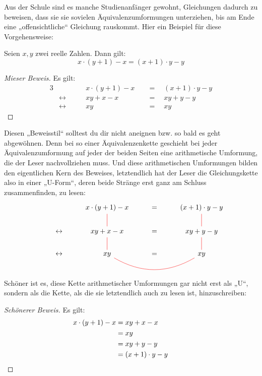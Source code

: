 \begin{bem}[„Gleichungs-U's“]
    Aus der Schule sind es manche Studienanfänger gewohnt, Gleichungen dadurch zu beweisen, dass sie sie sovielen Äquivalenzumformungen unterziehen, bis am Ende eine „offensichtliche“ Gleichung rauskommt. Hier ein Beispiel für diese Vorgehensweise:
    \begin{bsp}
    Seien $x,y$ zwei reelle Zahlen. Dann gilt:
        \[ x\cdot (y+1)-x = (x+1)\cdot y-y\]
    \end{bsp}
    \begin{proof}[Mieser Beweis]\let\qed\relax
        Es gilt:
        \begin{alignat*}{3}
            && x\cdot (y+1)-x& \quad=\quad (x+1)\cdot y-y \\
            &\leftrightarrow\qquad& xy + x  -x& \quad=\quad xy + y - y \\
            &\leftrightarrow\qquad& xy & \quad=\quad xy
        \end{alignat*}
    \end{proof}
    Diesen „Beweisstil“ solltest du dir nicht aneignen bzw. so bald es geht abgewöhnen. Denn bei so einer Äquivalenzenkette geschieht bei jeder Äquivalenzumformung auf jeder der beiden Seiten eine arithmetische Umformung, die der Leser nachvollziehen muss. Und diese arithmetischen Umformungen bilden den eigentlichen Kern des Beweises, letztendlich hat der Leser die Gleichungskette also in einer „U-Form“, deren beide Stränge erst ganz am Schluss zusammenfinden, zu lesen:
    \[\begin{tikzcd}
        && x\cdot (y+1)-x\ar[red, d, dash] & =& (x+1)\cdot y-y \ar[red, d, dash] \\
        &\leftrightarrow& xy + x-x  \ar[red, d, dash] & =& xy + y - y \ar[red, d, dash] \\
        &\leftrightarrow& xy \ar[red, rr, dash, bend right] & =& xy
    \end{tikzcd}\]
    Schöner ist es, diese Kette arithmetischer Umformungen gar nicht erst als „U“, sondern als die Kette, als die sie letztendlich auch zu lesen ist, hinzuschreiben:
    \begin{proof}[Schönerer Beweis]
        Es gilt:
        \begin{align*}
            x\cdot (y+1) -x& = xy + x -x\\
            & = xy  \\
            & = xy + y - y \\
            & = (x+1)\cdot y -y  &&&& \qedhere
        \end{align*}

\end{proof}
\end{bem}
